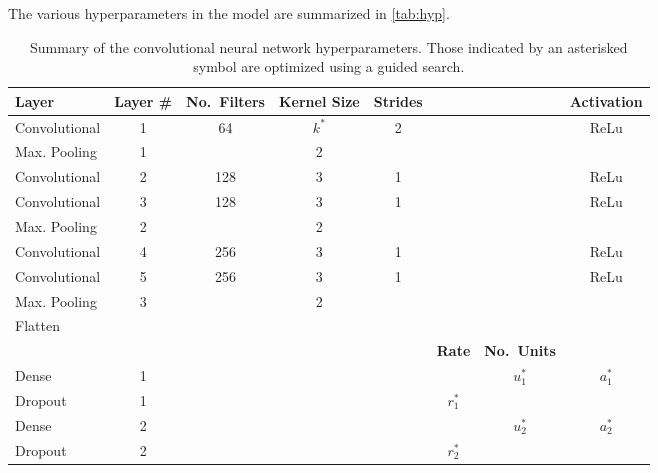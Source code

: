 \documentclass[Journal,letterpaper, SingleSpace, InsideFigs]{ascelike-new}
\begin{document}
The various hyperparameters in the model are summarized in \autoref{tab:hyp}.
\begin{table}[]\small
{}
    \centering
    \begin{tabular}{l c c c c c c c}\toprule
    \bf Layer & \bf Layer \# & \bf No.\ Filters & \bf Kernel Size & \bf Strides &
     &  & \bf Activation \\\midrule
    Convolutional  & 1         & 64                & $k^*$   & 2           &&& ReLu \\
    Max. Pooling   & 1         &                   & 2               &&&             &      \\
    Convolutional  & 2         & 128               & 3   & 1           &&& ReLu \\
    Convolutional  & 3         & 128               & 3   & 1           &&& ReLu \\
    Max. Pooling   & 2         &                   & 2               &&&             &      \\    
    Convolutional  & 4         & 256               & 3   & 1           &&& ReLu \\
    Convolutional  & 5         & 256               & 3   & 1           &&& ReLu \\
    Max. Pooling   & 3         &                   & 2               &             &&&      \\\midrule
    Flatten & & & & &&& \\\midrule
     &  &   &  & &
     \bf Rate & \bf No.\ Units & \\\midrule
    Dense           & 1  & & &  & & $u_1^*$ & $a_1^*$ \\
    Dropout         & 1  & & &  & $r_1^*$ & &  \\
    Dense           & 2  & & &  & & $u_2^*$ & $a_2^*$ \\
    Dropout         & 2  & & &  & $r_2^*$ & & \\ \bottomrule
    \end{tabular}
    \caption{Summary of the convolutional neural network hyperparameters. 
    Those indicated by an asterisked symbol are optimized using a guided search.}
    \label{tab:hyp}
\end{table}
\end{document}
